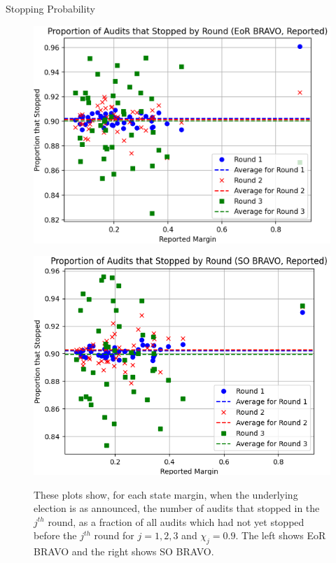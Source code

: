 \documentclass[final]{beamer}
\newcommand{\BRAVO}{\textsc{BRAVO}\xspace}
\newlength{\colwidth}
\begin{document}
\begin{frame}[t]
\begin{columns}[t]
\begin{column}{\colwidth}
\begin{block}{Stopping Probability}
\begin{figure}[h]
\centering
\begin{minipage}{.49\textwidth}
\includegraphics[width=1.0\textwidth]{eor_bravo_90perc_10^4_corrected/sprob_first_three_cropped.png}
\label{fig:eor_bravo_sprob}
\end{minipage}
\begin{minipage}{.49\textwidth}
\includegraphics[width=1.0\textwidth]{so_bravo_90perc_10^4/sprob_first_three.png}
\label{fig:so_bravo_sprob}
\end{minipage}
\caption{These plots show, for each state margin, when the underlying election is as announced, the number of audits that stopped in the $j^{th}$ round, as a fraction of all audits which had not yet stopped before the $j^{th}$ round for $j=1,2,3$ and $\chi_j=0.9$. The left shows EoR \BRAVO and the right shows SO \BRAVO.}
\end{figure}


\end{block}
\end{column}
\end{columns}
\end{frame}
\end{document}
